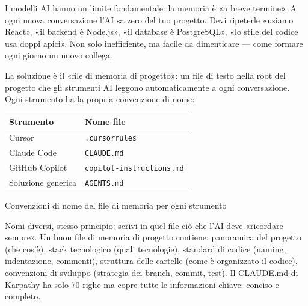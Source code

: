 


I modelli AI hanno un limite fondamentale: la memoria è «a breve termine». A ogni nuova conversazione l'AI sa zero del tuo progetto. Devi ripeterle «usiamo React», «il backend è Node.js», «il database è PostgreSQL», «lo stile del codice usa doppi apici». Non solo inefficiente, ma facile da dimenticare — come formare ogni giorno un nuovo collega.

La soluzione è il «file di memoria di progetto»: un file di testo nella root del progetto che gli strumenti AI leggono automaticamente a ogni conversazione. Ogni strumento ha la propria convenzione di nome:

\begin{center}
\begin{tabularx}{\linewidth}{|X|X|}
\hline
\textbf{Strumento} & \textbf{Nome file} \tabularnewline
\hline
Cursor & \texttt{.\allowbreak cursorrules} \tabularnewline
Claude Code & \texttt{CLAUDE.\allowbreak md} \tabularnewline
GitHub Copilot & \texttt{copilot-\allowbreak instructions.\allowbreak md} \tabularnewline
Soluzione generica & \texttt{AGENTS.\allowbreak md} \tabularnewline
\hline
\end{tabularx}
\end{center}

\begin{center}\small\color{gray}Convenzioni di nome del file di memoria per ogni strumento\end{center}

Nomi diversi, stesso principio: scrivi in quel file ciò che l'AI deve «ricordare sempre». Un buon file di memoria di progetto contiene: panoramica del progetto (che cos'è), stack tecnologico (quali tecnologie), standard di codice (naming, indentazione, commenti), struttura delle cartelle (come è organizzato il codice), convenzioni di sviluppo (strategia dei branch, commit, test). Il CLAUDE.md di Karpathy ha solo 70 righe ma copre tutte le informazioni chiave: conciso e completo.

